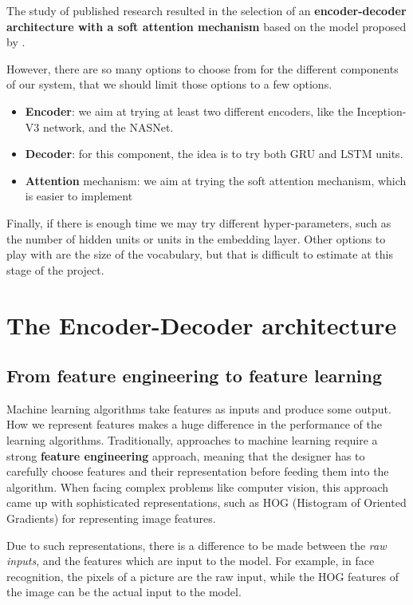 The study of published research resulted in the selection of an \textbf{encoder-decoder architecture with a soft attention mechanism} based on the model proposed by \citet{Xu2015}. 

However, there are so many options to choose from for the different components of our system, that we should limit those options to a few options.
\begin{itemize}
    \item \textbf{Encoder}: we aim at trying at least two different encoders, like the Inception-V3 network, and the NASNet.
    \item \textbf{Decoder}: for this component, the idea is to try both GRU and LSTM units. 
    \item \textbf{Attention} mechanism: we aim at trying the soft attention mechanism, which is easier to implement
\end{itemize}

Finally, if there is enough time we may try different hyper-parameters, such as the number of hidden units or units in the embedding layer. Other options to play with are the size of the vocabulary, but that is difficult to estimate at this stage of the project.

\section{The Encoder-Decoder architecture}\label{sec:encoder-decoder}

\subsection{From feature engineering to feature learning}

Machine learning algorithms take features as inputs and produce some output. How we represent features makes a huge difference in the performance of the learning algorithms.  Traditionally, approaches to machine learning require a strong \textbf{feature engineering} approach, meaning that the designer has to carefully choose features and their representation before feeding them into the algorithm. When facing complex problems like computer vision, this approach came up with sophisticated representations, such as HOG (Histogram of Oriented Gradients) for representing image features.

Due to such representations, there is a difference to be made between the \textit{raw inputs}, and the features which are input to the model. For example, in face recognition, the pixels of a picture are the raw input, while the HOG features of the image can be the actual input to the model.

